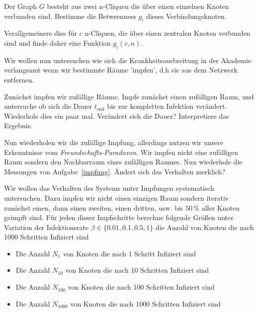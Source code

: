 \subexercise[%
  topic= Betweenness Zentralit\"at zweier verbundener n-Cliquen,
    ]

Der Graph $G$ besteht aus zwei n-Cliquen die \"uber einen einzelnen Knoten verbunden sind. Bestimme die Betweenness $g_i$ dieses Verbindungsknoten.

Verallgemeinere dies f\"ur $c$ n-Cliquen, die \"uber einen zentralen Knoten verbunden sind und finde daher eine Funktion $g_i(c,n)$.

%
		
\exercise[%
  topic =  Krankheitsausbruch in der Akademie -- Impfung
    ]
		
Wir wollen nun untersuchen wie sich die Krankheitsausbreitung in der Akademie verlangsamt wenn wir bestimmte R\"aume 'impfen', d.h sie aus dem Netzwerk entfernen.



\subexercise[%
  topic= Zuf\"allige Impfung,
    ]
\label{impfung}
Zun\"achst impfen wir zuf\"allige R\"aume. Impfe zun\"achst einen zuf\"alligen Raum, und untersuche ob sich die Dauer $t_{\mathrm{end}}$ bis zur kompletten Infektion ver\"andert. Wiederhole dies ein paar mal. Ver\"andert sich die Dauer? Interpretiere das Ergebnis.\\

\subexercise[%
  topic= Zuf\"allige Nachbarschafts-Impfung,
    ]

Nun wiederholen wir die zuf\"allige Impfung, allerdings nutzen wir unsere Erkenntnisse vom \emph{Freundschafts-Paradoxon}. Wir impfen nicht eine zuf\"alligen Raum sondern den Nachbarraum eines zuf\"alligen Raumes. Nun wiederhole die Messungen von Aufgabe~\ref{impfung}. Ändert sich das Verhalten merklich? 

\subexercise[%
  topic= Systematische Untersuchung des Impfverhaltens,
    ]

Wir wollen das Verhalten des Systems unter Impfungen systematisch untersuchen. Dazu impfen wir nicht einen einzigen Raum sondern iterativ zun\"achst einen, dann einen zweiten, einen dritten, usw. bis $50\,\%$ aller Knoten geimpft sind. F\"ur jeden dieser Impfschritte berechne folgende Gr\"o\ss en unter Variation der Infektionsrate $\beta \in \{0.01,0.1,0.5,1\}$ die Anzahl von Knoten die nach 1000 Schritten Infiziert sind

\begin{itemize}
\item Die Anzahl $N_{1}$ von Knoten die nach 1 Schritt Infiziert sind
\item Die Anzahl $N_{10}$ von Knoten die nach 10 Schritten Infiziert sind
\item Die Anzahl $N_{100}$ von Knoten die nach 100 Schritten Infiziert sind
\item Die Anzahl $N_{1000}$ von Knoten die nach 1000 Schritten Infiziert sind
\end{itemize}

